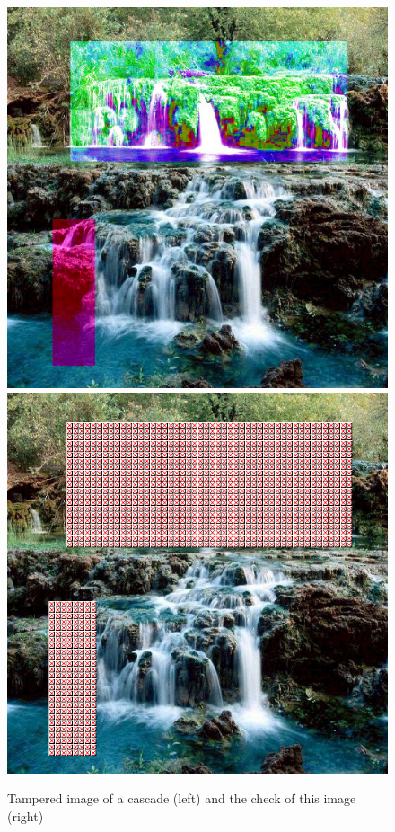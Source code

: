 \documentclass[11pt, oneside]{article}   	%
\begin{document}
			\begin{figure}[h!]
			\begin{center}
				\includegraphics[scale=0.34]{images_png/image1.jpg}
				\includegraphics[scale=0.34]{images_png/image2.jpg}
			\end{center}
			\caption{Tampered image of a cascade (left) and the check of this image (right)}
			\end{figure}
\end{document}
